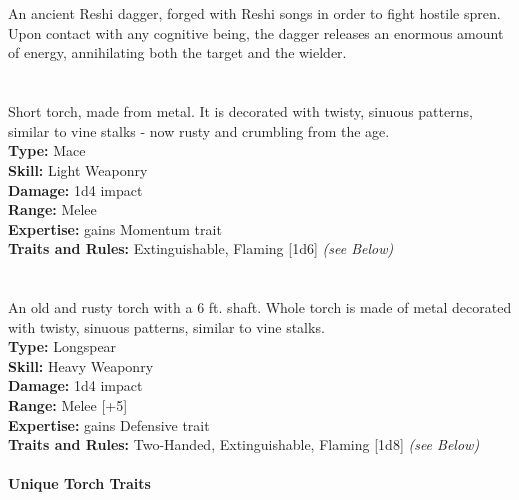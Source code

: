 \section{\lootSprenDaggerName}

An ancient Reshi dagger, forged with Reshi songs in order to fight hostile spren. Upon contact with any cognitive being, the dagger releases an enormous amount of energy, annihilating both the target and the wielder.

\section{\lootTorchShortName}

Short torch, made from metal. It is decorated with twisty, sinuous patterns, similar to vine stalks - now rusty and crumbling from the age. \\

\noindent
\textbf{Type:} Mace \\
\textbf{Skill:} Light Weaponry\\
\textbf{Damage:} 1d4 impact \\
\textbf{Range:} Melee\\
\textbf{Expertise:} gains Momentum trait\\
\textbf{Traits and Rules:} Extinguishable, Flaming [1d6] \textit{(see Below)}


\section{\lootTorchLongName}

An old and rusty torch with a 6 ft. shaft. Whole torch is made of metal decorated with twisty, sinuous patterns, similar to vine stalks. \\

\noindent
\textbf{Type:} Longspear \\
\textbf{Skill:} Heavy Weaponry\\
\textbf{Damage:} 1d4 impact \\
\textbf{Range:} Melee [+5]\\
\textbf{Expertise:} gains Defensive trait\\
\textbf{Traits and Rules:} Two-Handed, Extinguishable, Flaming [1d8] \textit{(see Below)} \\ \\

\noindent \Large \textbf{Unique Torch Traits} \normalsize \\





